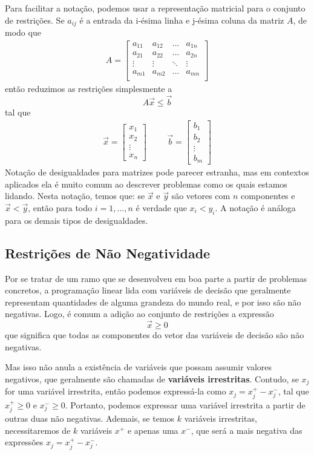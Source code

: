 Para facilitar a notação, podemos usar a representação matricial para o conjunto de
restrições. Se $a_{ij}$ é a entrada da i-ésima linha e j-ésima coluna da
matriz $A$, de modo que
\begin{gather*}
A = \begin{bmatrix}
	a_{11} & a_{12} & \ldots & a_{1n} \\
	a_{21} & a_{22} & \ldots & a_{2n} \\
	\vdots & \vdots & \ddots & \vdots \\
	a_{m1} & a_{m2} & \ldots & a_{mn} \\
\end{bmatrix}
\end{gather*}
então reduzimos as restrições simplesmente a \[A \vec x \leq \vec b\]tal que
\begin{align*}
\vec x = \begin{bmatrix}
	x_1 \\ x_2 \\ \vdots \\ x_n
\end{bmatrix}
\hspace{1cm}
\vec b = \begin{bmatrix}
	b_1 \\ b_2 \\ \vdots \\ b_m
\end{bmatrix}
\end{align*}
Notação de desigualdades para matrizes pode parecer estranha, mas em contextos
aplicados ela é muito comum ao descrever problemas como os quais estamos lidando.
Nesta notação, temos que: se $\vec x$ e $\vec y$ são vetores com $n$ componentes
e $\vec x < \vec y$, então para todo $i = 1,\dots,n$ é verdade que $x_i < y_i$.
A notação é análoga para os demais tipos de desigualdades.

\subsection{Restrições de Não Negatividade}
Por se tratar de um ramo que se desenvolveu em boa parte a partir de problemas concretos,
a programação linear lida com variáveis de decisão que geralmente representam
quantidades de alguma grandeza do mundo real, e por isso são não negativas.
Logo, é comum a adição ao conjunto de restrições a expressão \[\vec x \geq 0\]
que significa que todas as componentes do vetor das variáveis de decisão são não negativas.

Mas isso não anula a existência de variáveis que possam assumir valores negativos, que geralmente são chamadas de \textbf{variáveis irrestritas}. Contudo, se $x_j$ for uma variável irrestrita, então podemos expressá-la como $x_j = x_j^+ - x_j^-$, tal que $x_j^+ \geq 0$ e $x_j^- \geq 0$. Portanto, podemos expressar uma variável irrestrita a partir de outras duas não negativas. Ademais, se temos $k$ variáveis irrestritas, necessitaremos de $k$ variáveis $x^+$ e apenas uma $x^-$, que será a mais negativa das expressões $x_j = x^+_j - x^-_j$.

